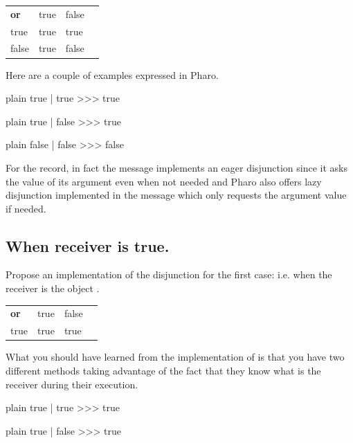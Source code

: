 \documentclass[10pt,twoside,english]{_support/latex/sbabook/sbabook}
\begin{document}
\begin{tabular}{llll}
\toprule
\textbf{or} & true & false &  \\
true & true & true &  \\
false & true & false &  \\
\bottomrule
\end{tabular}

Here are a couple of examples expressed in Pharo. 

\begin{displaycode}{plain}
true | true
>>> true
\end{displaycode}

\begin{displaycode}{plain}
true | false 
>>> true
\end{displaycode}

\begin{displaycode}{plain}
false | false 
>>> false
\end{displaycode}

For the record, in fact the message \textcode{\textbar{}} implements an eager disjunction since it asks the value of its argument even when not needed and Pharo also offers lazy disjunction implemented in the message  which only requests the argument value if needed.
\subsection{When receiver is true.}
Propose an implementation of the disjunction for the first case: i.e. when the receiver is the object .

\begin{tabular}{llll}
\toprule
\textbf{or} & true & false &  \\
true & true & true &  \\
\bottomrule
\end{tabular}

 What you should have learned from the implementation of  is that you have two different methods taking advantage of the fact that they know what is the receiver during their execution. 

\begin{displaycode}{plain}
true | true 
>>> true
\end{displaycode}

\begin{displaycode}{plain}
true | false 
>>> true
\end{displaycode}
\end{document}

